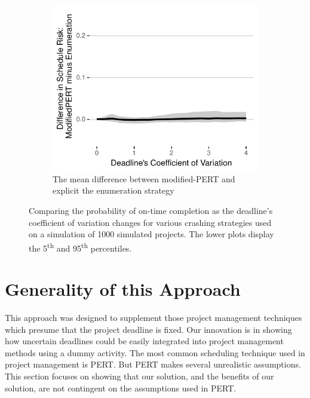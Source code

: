 \documentclass[11pt]{article}
\begin{document}
\begin{figure}[H]
\begin{center}
\begin{subfigure}[t]{0.35\linewidth}
\end{subfigure}
\begin{subfigure}[t]{0.35\linewidth}
\includegraphics[width=\textwidth]{2018-07-25_brute.pdf}
\caption{The mean difference between modified-PERT and explicit the enumeration strategy}
\label{fig:brute_dif}
\end{subfigure}
\caption{Comparing the probability of on-time completion as the deadline's coefficient of variation changes for various crashing strategies used on a simulation of 1000 simulated projects. The lower plots display the 5\textsuperscript{th} and 95\textsuperscript{th} percentiles.}
\end{center}
\end{figure}


\section{Generality of this Approach}
This approach was designed to supplement those project management techniques which presume that the project deadline is fixed.  Our innovation is in showing how uncertain deadlines could be easily integrated into project management methods using a dummy activity.  The most common scheduling technique used in project management is PERT.  But PERT makes several unrealistic assumptions.  This section focuses on showing that our solution, and the benefits of our solution, are not contingent on the assumptions used in PERT.  
\end{document}
